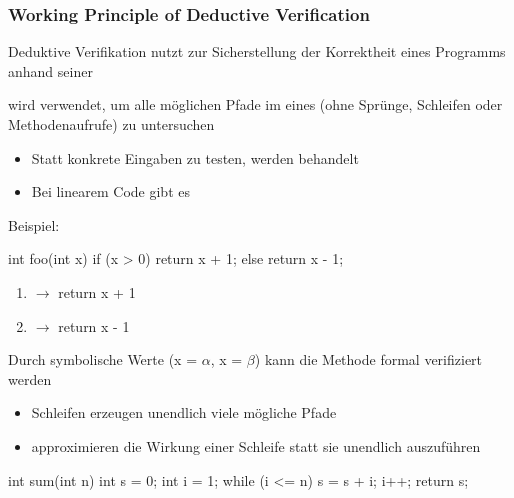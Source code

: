\subsubsection*{Working Principle of Deductive Verification}
\begin{infoBox}
    Deduktive Verifikation nutzt  zur Sicherstellung der Korrektheit eines Programms anhand seiner 
\end{infoBox}
\begin{infoBox}[title=Path Exploration (Wege-Exploration)]
     wird verwendet, um alle möglichen Pfade im  eines  (ohne Sprünge, Schleifen oder Methodenaufrufe) zu untersuchen
    \begin{itemize}
        \item {} Statt konkrete Eingaben zu testen, werden  behandelt
        \item {} Bei linearem Code gibt es 
    \end{itemize}
    Beispiel:
    \begin{codeBlock}{}
        int foo(int x) {
            if (x > 0) return x + 1;
            else return x - 1;
        }
    \end{codeBlock}
    \begin{enumerate}
        \item {} $\rightarrow$ return x + 1
        \item {} $\rightarrow$ return x - 1
    \end{enumerate}
    Durch symbolische Werte (x = $\alpha$, x = $\beta$) kann die Methode  formal verifiziert werden
\end{infoBox}
\begin{infoBox}[title=Umgang mit Schleifen - Loop Invariants]
    \begin{itemize}
        \item {} Schleifen erzeugen unendlich viele mögliche Pfade
        \item {} approximieren die Wirkung einer Schleife statt sie unendlich auszuführen
    \end{itemize}
    \begin{codeBlock}{}
        int sum(int n) {
        int s = 0;
        int i = 1;
        while (i <= n) {
            s = s + i;
            i++;
        }
        return s;
    }
    \end{codeBlock}
\end{infoBox}
